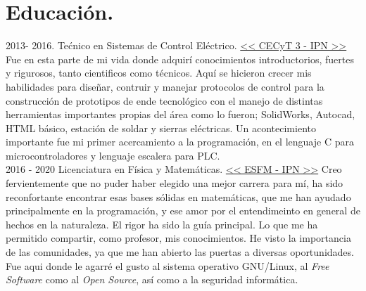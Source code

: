 \documentclass[]{friggeri-cv}
\begin{document}
\section{Educación.}
\begin{entrylist}
  \entry
    {2013- 2016.}
    {Tećnico en Sistemas de Control Eléctrico.}
    {\href{https://cecyt3.ipn.mx}{<< CECyT 3 - IPN >>}}
{ Fue en esta parte de mi vida donde adquirí conocimientos introductorios, fuertes y rigurosos, tanto cientificos como técnicos. Aquí se hicieron crecer mis habilidades para diseñar, contruir y manejar protocolos de control para la construcción de prototipos de ende tecnológico con el manejo de distintas herramientas importantes propias del área como lo fueron; SolidWorks, Autocad, HTML básico, estación de soldar y sierras eléctricas. Un acontecimiento importante fue mi primer acercamiento a la programación, en el lenguaje C para microcontroladores y lenguaje escalera para PLC.
    \\}
  \entry
    {2016 - 2020}
    {Licenciatura en Física y Matemáticas.}
    {\href{https://www.esfm.ipn.mx}{<< ESFM - IPN >>}}
    {
    Creo fervientemente que no puder haber elegido una mejor carrera para mí, ha sido reconfortante encontrar esas bases sólidas en matemáticas, que me han ayudado principalmente en la programación, y ese amor por el entendimeinto en general de hechos en la naturaleza. El rigor ha sido la guía principal. Lo que me ha permitido compartir, como profesor, mis conocimientos. He visto la importancia de las comunidades, ya que me han abierto las puertas a diversas oportunidades. Fue aqui donde le agarré el gusto al sistema operativo GNU/Linux, al \textit{Free Software} como al \textit{Open Source}, así como a la seguridad informática.  
    \\}
  
\end{entrylist}
\end{document}
